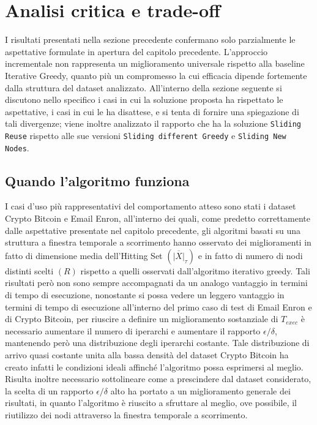 
\section{Analisi critica e trade-off}\label{sec:analisi_critica_e_trade_off}

I risultati presentati nella sezione precedente confermano solo parzialmente le aspettative formulate in apertura del capitolo precedente.
L'approccio incrementale non rappresenta un miglioramento universale rispetto alla baseline Iterative Greedy, quanto più un compromesso la cui efficacia dipende fortemente dalla struttura del dataset analizzato.
All'interno della sezione seguente si discutono nello specifico i casi in cui la soluzione proposta ha rispettato le aspettative, i casi in cui le ha disattese, e si tenta di fornire una spiegazione di tali divergenze; viene inoltre analizzato il rapporto che ha la soluzione \texttt{Sliding Reuse} rispetto alle sue versioni \texttt{Sliding different Greedy} e \texttt{Sliding New Nodes}.

\subsection*{Quando l'algoritmo funziona}

I casi d'uso più rappresentativi del comportamento atteso sono stati i dataset Crypto Bitcoin e Email Enron, all'interno dei quali, come predetto correttamente dalle aspettative presentate nel capitolo precedente, gli algoritmi basati su una struttura a finestra temporale a scorrimento hanno osservato dei miglioramenti in fatto di dimensione media dell'Hitting Set $(\overline{|X|}_{\tau})$ e in fatto di numero di nodi distinti scelti $(R)$ rispetto a quelli osservati dall'algoritmo iterativo greedy.
Tali risultati però non sono sempre accompagnati da un analogo vantaggio in termini di tempo di esecuzione, nonostante si possa vedere un leggero vantaggio in termini di tempo di esecuzione all'interno del primo caso di test di Email Enron e di Crypto Bitcoin, per riuscire a definire un miglioramento sostanziale di $T_{exec}$ è necessario aumentare il numero di iperarchi e aumentare il rapporto $\epsilon/\delta$, mantenendo però una distribuzione degli iperarchi costante.
Tale distribuzione di arrivo quasi costante unita alla bassa densità del dataset Crypto Bitcoin ha creato infatti le condizioni ideali affinché l'algoritmo possa esprimersi al meglio.
Risulta inoltre necessario sottolineare come a prescindere dal dataset considerato, la scelta di un rapporto $\epsilon/\delta$ alto ha portato a un miglioramento generale dei risultati, in quanto l'algoritmo è riuscito a sfruttare al meglio, ove possibile, il riutilizzo dei nodi attraverso la finestra temporale a scorrimento.

